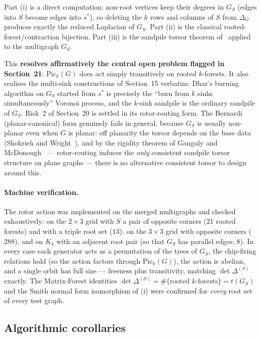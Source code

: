 \documentclass[11pt]{article}
\begin{document}
Part (i) is a direct computation: non-root vertices keep their degrees in
$G_S$ (edges into $S$ become edges into $s^*$), so deleting the $k$ rows and
columns of $S$ from $\Delta_G$ produces exactly the reduced Laplacian of $G_S$.
Part (ii) is the classical rooted-forest/contraction bijection. Part (iii) is
the sandpile torsor theorem of~\cite{holroyd2008chip} applied to the multigraph
$G_S$.

This \textbf{resolves affirmatively the central open problem flagged in
Section~21}: $\mathrm{Pic}_k(G)$ does act simply transitively on rooted
$k$-forests. It also realises the multi-sink constructions of Section~15
verbatim: Dhar's burning algorithm on $G_S$ started from $s^*$ is precisely
the ``burn from $k$ sinks simultaneously'' Voronoi process, and the $k$-sink
sandpile is the ordinary sandpile of $G_S$. Risk~2 of Section~20 is settled in
its rotor-routing form. The Bernardi (planar-canonical) form genuinely fails in
general, because $G_S$ is usually non-planar even when $G$ is planar: off
planarity the torsor depends on the base data (Shokrieh and
Wright~\cite{shokrieh2021torsor}), and by the rigidity theorem of Ganguly and
McDonough~\cite{ganguly2023rotor} --- rotor-routing induces the \emph{only}
consistent sandpile torsor structure on plane graphs --- there is no
alternative consistent torsor to design around this.

\paragraph{Machine verification.}
The rotor action was implemented on the merged multigraphs and checked
exhaustively: on the $2 \times 3$ grid with $S$ a pair of opposite corners
($21$ rooted forests) and with a triple root set ($13$), on the $3 \times 3$
grid with opposite corners ($288$), and on $K_4$ with an adjacent root pair
(so that $G_S$ has parallel edges; $8$). In every case each generator acts as
a permutation of the trees of $G_S$, the chip-firing relations hold (so the
action factors through $\mathrm{Pic}_k(G)$), the action is abelian, and a
single orbit has full size --- freeness plus transitivity, matching
$\det \Delta^{(S)}$ exactly. The Matrix-Forest identities
$\det \Delta^{(S)} = \#\{\text{rooted $k$-forests}\} = t(G_S)$ and the Smith
normal form isomorphism of (i) were confirmed for \emph{every} root set of
every test graph.

\subsection{Algorithmic corollaries}
\end{document}

